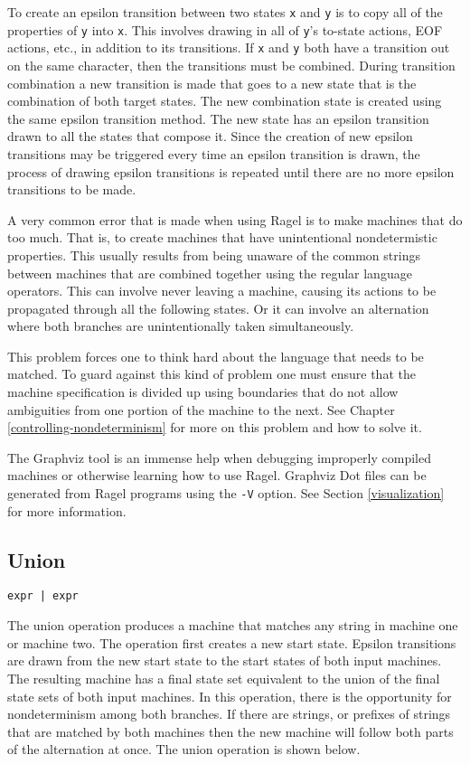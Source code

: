 \documentclass[letterpaper,11pt,oneside]{book}
\newcommand{\verbspace}{\vspace{10pt}}
\begin{document}
To create an epsilon transition between two states \verb|x| and \verb|y| is to
copy all of the properties of \verb|y| into \verb|x|. This involves drawing in
all of \verb|y|'s to-state actions, EOF actions, etc., in addition to its
transitions. If \verb|x| and \verb|y| both have a transition out on the same
character, then the transitions must be combined.  During transition
combination a new transition is made that goes to a new state that is the
combination of both target states. The new combination state is created using
the same epsilon transition method.  The new state has an epsilon transition
drawn to all the states that compose it. Since the creation of new epsilon
transitions may be triggered every time an epsilon transition is drawn, the
process of drawing epsilon transitions is repeated until there are no more
epsilon transitions to be made.

A very common error that is made when using Ragel is to make machines that do
too much. That is, to create machines that have unintentional
nondetermistic properties. This usually results from being unaware of the common strings
between machines that are combined together using the regular language
operators. This can involve never leaving a machine, causing its actions to be
propagated through all the following states. Or it can involve an alternation
where both branches are unintentionally taken simultaneously.

This problem forces one to think hard about the language that needs to be
matched. To guard against this kind of problem one must ensure that the machine
specification is divided up using boundaries that do not allow ambiguities from
one portion of the machine to the next. See Chapter
\ref{controlling-nondeterminism} for more on this problem and how to solve it.

The Graphviz tool is an immense help when debugging improperly compiled
machines or otherwise learning how to use Ragel. Graphviz Dot files can be
generated from Ragel programs using the \verb|-V| option. See Section
\ref{visualization} for more information.


\subsection{Union}

\verb/expr | expr/
\verbspace

The union operation produces a machine that matches any string in machine one
or machine two. The operation first creates a new start state. Epsilon
transitions are drawn from the new start state to the start states of both
input machines.  The resulting machine has a final state set equivalent to the
union of the final state sets of both input machines. In this operation, there
is the opportunity for nondeterminism among both branches. If there are
strings, or prefixes of strings that are matched by both machines then the new
machine will follow both parts of the alternation at once. The union operation is
shown below.
\end{document}
